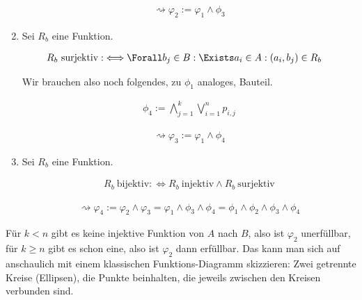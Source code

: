 \begin{solution}
\begin{enumerate}[label = \arabic*.]
  \begin{align*}
    \rightsquigarrow
    \varphi_2
    :=
    \varphi_1 \land \phi_3
  \end{align*}


  \item Sei $R_b$ eine Funktion.

  \begin{align*}
    R_b ~\text{surjektiv}
    :\iff
    & \Forall b_j \in B:
    \Exists a_i \in A:
    (a_i, b_j) \in R_b
  \end{align*}

  Wir brauchen also noch folgendes, zu $\phi_1$ analoges, Bauteil.

  \begin{align*}
    \phi_4
    :=
    \bigwedge_{j=1}^k \bigvee_{i=1}^np_{i,j}
  \end{align*}

  \begin{align*}
    \rightsquigarrow
    \varphi_3
    :=
    \varphi_1 \land \phi_4
  \end{align*}


  \item Sei $R_b$ eine Funktion.

  \begin{align*}
    R_b ~\text{bijektiv}
    :\iff
    R_b ~\text{injektiv}
    \land
    R_b ~\text{surjektiv}
  \end{align*}

  \begin{align*}
    \rightsquigarrow
    \varphi_4
    :=
    \varphi_2 \land \varphi_3
    =
    \varphi_1 \land \phi_3 \land \phi_4
    =
    \phi_1 \land \phi_2 \land \phi_3 \land \phi_4
  \end{align*}

\end{enumerate}

Für $k < n$ gibt es keine injektive Funktion von $A$ nach $B$, also ist $\varphi_2$ unerfüllbar, für $k \geq n$ gibt es schon eine, also ist $\varphi_2$ dann erfüllbar.
Das kann man sich auf anschaulich mit einem klassischen Funktions-Diagramm skizzieren:
Zwei getrennte Kreise (Ellipsen), die Punkte beinhalten, die jeweils zwischen den Kreisen verbunden sind.

\end{solution}

